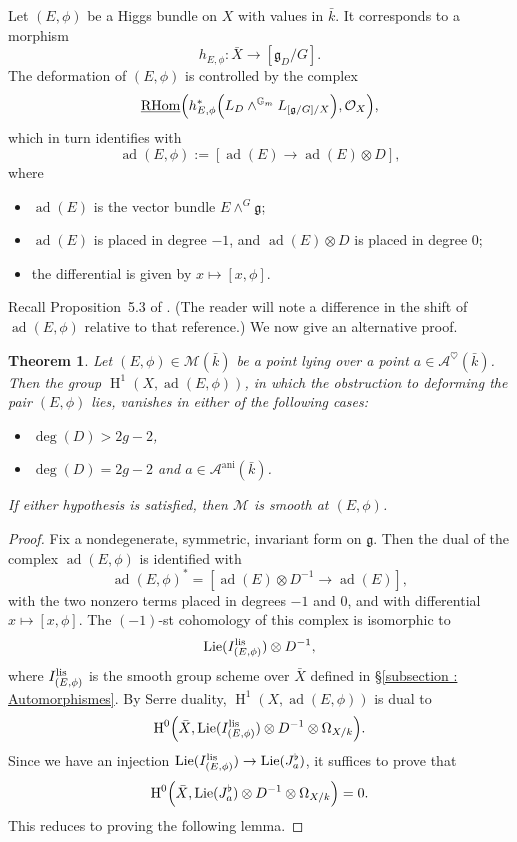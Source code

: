 \documentclass[12pt,english]{smfart}
\numberwithin{equation}{subsection}
\newtheorem{theoreme}[equation]{Theorem}
\theoremstyle{remark}
\begin{document}
Let $(E,\phi)$ be a Higgs bundle on $X$ with values in $\bar{k}$. It corresponds to a morphism
$$
h_{E,\phi}:\bar{X}\rightarrow [\mathfrak{g}_D/G].
$$
The deformation of $(E,\phi)$ is controlled by the complex
$$
\underline{\operatorname{RHom}}\Bigl(h_{E,\phi}^*\Bigl(L_D\wedge^{\mathbb{G}_m} L_{[\mathfrak{g}/G]/X}\Bigr),\mathcal{O}_X\Bigr),
$$
which in turn identifies with
$$
\operatorname{ad}(E,\phi):=[\operatorname{ad}(E)\longrightarrow \operatorname{ad}(E)\otimes D],
$$
where
\begin{itemize}
\item $\operatorname{ad}(E)$ is the vector bundle $E\wedge^G \mathfrak{g}$;
\item $\operatorname{ad}(E)$ is placed in degree $-1$, and $\operatorname{ad}(E)\otimes D$ is placed in degree $0$;
\item the differential is given by $x\mapsto [x,\phi]$.
\end{itemize}

Recall Proposition~5.3 of \cite{N}. (The reader will note a difference in the shift of $\operatorname{ad}(E,\phi)$ relative to that reference.)
We now give an alternative proof.

\begin{theoreme}\label{lisse}
Let $(E,\phi)\in \mathcal{M}(\bar{k})$ be a point lying over a point $a\in\mathcal{A}^\heartsuit(\bar{k})$.
Then the group $\operatorname{H}^1(X,\operatorname{ad}(E,\phi))$, in which the obstruction to deforming the pair $(E,\phi)$ lies,
vanishes in either of the following cases:
\begin{itemize}
\item $\deg(D)> 2g-2$,
\item $\deg(D)= 2g-2$ and $a\in \mathcal{A}^\mathrm{ani}(\bar{k})$.
\end{itemize}
If either hypothesis is satisfied, then $\mathcal{M}$ is smooth at $(E,\phi)$.
\end{theoreme}

\begin{proof}
Fix a nondegenerate, symmetric, invariant form on $\mathfrak{g}$. Then the dual of the complex $\operatorname{ad}(E,\phi)$
is identified with
$$
\operatorname{ad}(E,\phi)^*=[\operatorname{ad}(E)\otimes D^{-1}\longrightarrow \operatorname{ad}(E)],
$$
with the two nonzero terms placed in degrees $-1$ and $0$, and with differential $x\mapsto [x,\phi]$.
The $(-1)$-st cohomology of this complex is isomorphic to
$$
\operatorname{Lie}(I_{(E,\phi)}^{\rm lis})\otimes D^{-1},
$$
where $I_{(E,\phi)}^{\rm lis}$ is the smooth group scheme over $\bar X$ defined in \S\ref{subsection : Automorphismes}.
By Serre duality, $\operatorname{H}^1(X,\operatorname{ad}(E,\phi))$ is dual to
$$
\operatorname{H}^0\Bigl(\bar{X},\operatorname{Lie}(I_{(E,\phi)}^{\rm lis})\otimes D^{-1}\otimes \Omega_{X/k}\Bigr).
$$
Since we have an injection $\operatorname{Lie}(I_{(E,\phi)}^{\rm lis})\rightarrow \operatorname{Lie}(J_a^\flat)$,
it suffices to prove that
$$
\operatorname{H}^0\Bigl(\bar{X},\operatorname{Lie}(J_a^\flat)\otimes D^{-1}\otimes \Omega_{X/k}\Bigr)=0.
$$
This reduces to proving the following lemma.
\end{proof}
\end{document}

